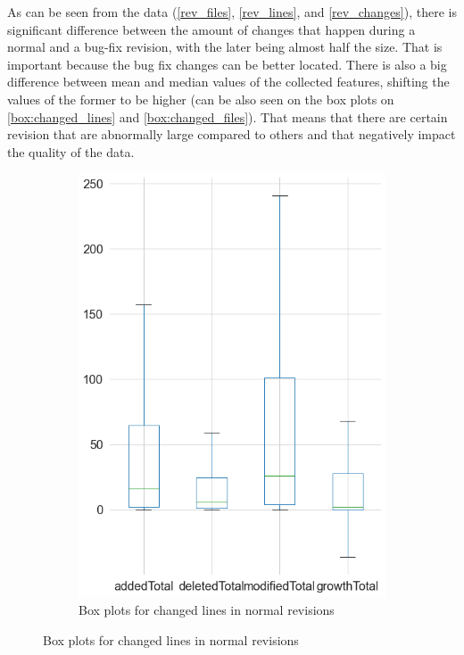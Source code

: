 As can be seen from the data (\cref{rev_files}, \cref{rev_lines}, and \cref{rev_changes}), there is significant difference between the amount of changes that happen during a normal and a bug-fix revision, with the later being almost half the size. That is important because the bug fix changes can be better located. There is also a big difference between mean and median values of the collected features, shifting the values of the former to be higher (can be also seen on the box plots on \cref{box:changed_lines} and \cref{box:changed_files}). That means that there are certain revision that are abnormally large compared to others and that negatively impact the quality of the data. 

\begin{figure}[H]
	\begin{subfigure}{0.5\textwidth}
		\centering
		\includegraphics[scale=0.3]{./src/data_analysis/normal_box_lines.png}
		\caption{Box plots for changed lines in normal revisions}

\end{subfigure}
\end{figure}
